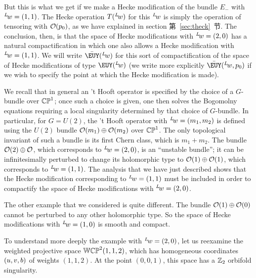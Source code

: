 But this is what we get if we make a Hecke modification of the
bundle $E_-$ with $^L\negthinspace w=(1,1)$.  The Hecke operation
$T(^L\negthinspace w)$ for this $^L\negthinspace w$ is simply the
operation of tensoring with ${\cal O}(p_0)$, as we have explained
in section 第~\ref{sec:theck}~节.  The conclusion, then, is that the space of
Hecke modifications with $^L\negthinspace w=(2,0)$ has a natural
compactification in which one also allows a Hecke modification
with $^L\negthinspace w=(1,1)$.  We will write $\bar
{{\EUY}}(^L\negthinspace w)$ for this sort of compactification of
the space of Hecke modifications of type ${{\EUY}}(^L\negthinspace
w)$ (we write more explicitly $\bar {{\EUY}}(^L\negthinspace
w,p_0)$ if we wish to specify the point at which the Hecke
modification is made).

We recall that in general an 't Hooft operator is specified by the
choice of a $G$-bundle over $\Bbb{CP}^1$; once such a choice is
given, one then solves the Bogomolny equations requiring a local
singularity determined by that choice of $G$-bundle. In
particular, for $G=U(2)$, the 't Hooft operator with
$^L\negthinspace w=(m_1,m_2)$ is defined using the $U(2)$ bundle
${\cal O}(m_1)\oplus {\cal O}(m_2)$ over $\Bbb{CP}^1$.  The only
topological invariant of such a bundle is its first Chern class,
which is $m_1+m_2$. The bundle ${\cal O}(2)\oplus {\cal O}$, which
corresponds to $^L\negthinspace w=(2,0)$, is an ``unstable
bundle''; it can be infinitesimally perturbed to change its
holomorphic type to ${\cal O}(1)\oplus {\cal O}(1)$, which
corresponds to $^L\negthinspace w =(1,1)$. The analysis that we
have just described shows that the Hecke modification
corresponding to $^L\negthinspace w=(1,1)$ must be included in
order to compactify the space of Hecke modifications with
$^L\negthinspace w=(2,0)$.

The other example that we considered is quite different.  The
bundle ${\cal O}(1)\oplus {\cal O}(0)$  cannot be perturbed to any
other holomorphic type. So the space of Hecke modifications with
$^L\negthinspace w=(1,0)$  is smooth and compact.

\par{}

To understand more deeply the example with $^L\negthinspace
w=(2,0)$, let us reexamine the weighted projective space
$\Bbb{WCP}^2(1,1,2)$, which has homogeneous coordinates $(u,v,b)$
of weights $(1,1,2)$. At the point $(0,0,1)$, this space has a
$\Bbb{Z}_2$ orbifold singularity.

